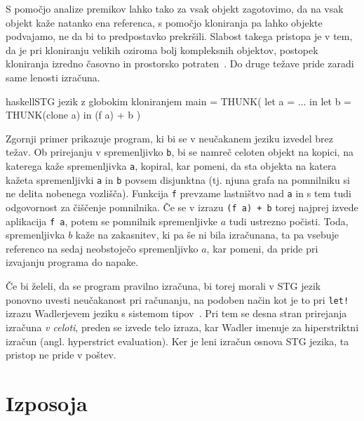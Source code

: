 S pomočjo analize premikov lahko tako za vsak objekt zagotovimo, da na vsak objekt kaže natanko ena referenca, s pomočjo kloniranja pa lahko objekte podvajamo, ne da bi to predpostavko prekršili. Slabost takega pristopa je v tem, da je pri kloniranju velikih oziroma bolj kompleksnih objektov, postopek kloniranja izredno časovno in prostorsko potraten~\cite{wadler1990linear, lafont1988linear}. Do druge težave pride zaradi same lenosti izračuna.

\begin{code-box}{haskell}{STG jezik z globokim kloniranjem \xmark}
main = THUNK(
    let a = ... in
    let b = THUNK(clone a) in
        (f a) + b
)
\end{code-box}

Zgornji primer prikazuje program, ki bi se v neučakanem jeziku izvedel brez težav. Ob prirejanju v spremenljivko \texttt{b}, bi se namreč celoten objekt na kopici, na katerega kaže spremenljivka \texttt{a}, kopiral, kar pomeni, da sta objekta na katera kažeta spremenljivki \texttt{a} in \texttt{b} povsem disjunktna (tj. njuna grafa na pomnilniku si ne delita nobenega vozlišča). Funkcija \texttt{f} prevzame lastništvo nad \texttt{a} in s tem tudi odgovornost za čiščenje pomnilnika. Če se v izrazu \texttt{(f a) + b} torej najprej izvede aplikacija \texttt{f a}, potem se pomnilnik spremenljivke $a$ tudi ustrezno počisti. Toda, spremenljivka $b$ kaže na zakasnitev, ki pa še ni bila izračunana, ta pa vsebuje referenco na sedaj neobstoječo spremenljivko $a$, kar pomeni, da pride pri izvajanju programa do napake.

Če bi želeli, da se program pravilno izračuna, bi torej morali v STG jezik ponovno uvesti neučakanost pri računanju, na podoben način kot je to pri \texttt{let!} izrazu Wadlerjevem jeziku s sistemom  tipov~\cite{wadler1990linear}. Pri tem se desna stran prirejanja izračuna \emph{v celoti}, preden se izvede telo izraza, kar Wadler imenuje za hiperstriktni izračun (angl. hyperstrict evaluation). Ker je leni izračun osnova STG jezika, ta pristop ne pride v poštev.

\section{Izposoja}


